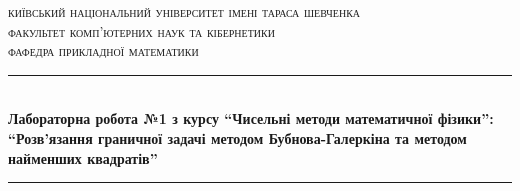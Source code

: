 
\setlength\parindent{0pt} %



\begin{titlepage}

\newcommand{\HRule}{\rule{\linewidth}{0.5mm}} %

\center %
 

\textsc{\Large київський національний університет імені тараса шевченка}\\[1.5cm] %
\textsc{\large факультет комп'ютерних наук та кібернетики}\\[0.5cm] %
\textsc{\large фафедра прикладної математики}\\[0.5cm] %


\HRule \\[0.4cm]
{ \Large \bfseries Лабораторна робота №1 з курсу “Чисельні методи математичної фізики”:}\\[0.4cm] %
{ \Large \bfseries “Розв'язання граничної задачі методом Бубнова-Галеркіна та методом найменших квадратів” }
\HRule \\[1.5cm]
 


\end{titlepage}
